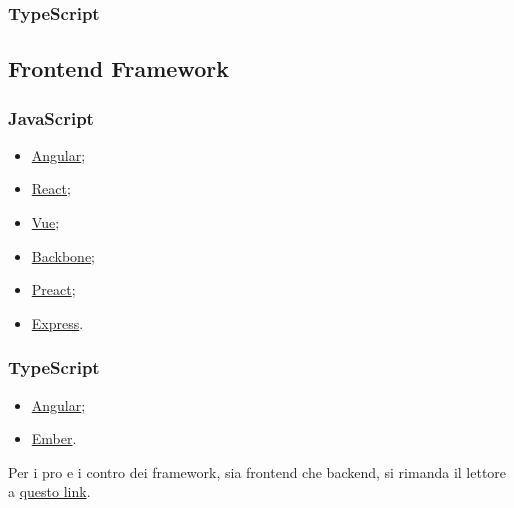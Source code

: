 \documentclass[a4paper, 12pt]{article}
\begin{document}
\subsubsection{TypeScript}

\subsection{Frontend Framework}
\subsubsection{JavaScript}
\begin{itemize}
    \item \href{https://angularjs.org/}{Angular};
    \item \href{https://react.dev/}{React};
    \item \href{https://vuejs.org/}{Vue};
    \item \href{https://backbonejs.org/}{Backbone};
    \item \href{https://preactjs.com/}{Preact};
    \item \href{https://expressjs.com/}{Express}.
\end{itemize}
\subsubsection{TypeScript}
\begin{itemize}
    \item \href{https://angularjs.org/}{Angular};
    \item \href{https://emberjs.com/}{Ember}.
\end{itemize}
Per i pro e i contro dei framework, sia frontend che backend, si rimanda il lettore a \href{https://blog.geekandjob.com/framework-javascript/}{questo link}.
\newpage
\end{document}
